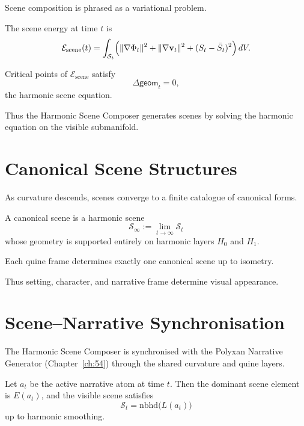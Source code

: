 Scene composition is phrased as a variational problem.

\begin{definition}
The scene energy at time $t$ is
\[
\mathcal{E}_{\mathrm{scene}}(t)
=
\int_{\mathcal{S}_t}
\Bigl(
  \|\nabla \Phi_t\|^2
  + \|\nabla\mathbf{v}_t\|^2
  + (S_t - \bar{S}_t)^2
\Bigr) \, dV.
\]
\end{definition}

\begin{theorem}
Critical points of $\mathcal{E}_{\mathrm{scene}}$ satisfy
\[
\Delta \mathsf{geom}_t = 0,
\]
the harmonic scene equation.
\end{theorem}

Thus the Harmonic Scene Composer generates scenes by solving the harmonic
equation on the visible submanifold.


\section{Canonical Scene Structures}
\label{sec:55:canonical}

As curvature descends, scenes converge to a finite catalogue of canonical
forms.

\begin{definition}
A canonical scene is a harmonic scene
\[
\mathcal{S}_\infty := \lim_{t\to\infty} \mathcal{S}_t
\]
whose geometry is supported entirely on harmonic layers $H_0$ and $H_1$.
\end{definition}

\begin{theorem}
Each quine frame determines exactly one canonical scene up to isometry.
\end{theorem}

Thus setting, character, and narrative frame determine visual appearance.


\section{Scene–Narrative Synchronisation}
\label{sec:55:synchronisation}

The Harmonic Scene Composer is synchronised with the Polyxan Narrative
Generator (Chapter~\ref{ch:54}) through the shared curvature and quine layers.

\begin{theorem}
Let $a_t$ be the active narrative atom at time $t$.
Then the dominant scene element is $E(a_t)$, and the visible scene satisfies
\[
\mathcal{S}_t =
\mathrm{nbhd}\bigl( L(a_t) \bigr)
\]
up to harmonic smoothing.
\end{theorem}

